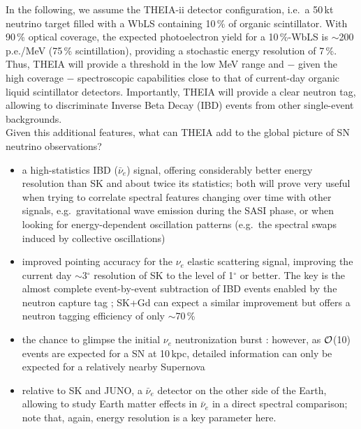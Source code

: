 In the following, we assume the THEIA-ii detector configuration, i.e.~a 50\,kt neutrino target filled with a WbLS containing 10\,\% of organic scintillator. With 90\,\% optical coverage, the expected photoelectron yield for a 10\,\%-WbLS is $\sim$200\,p.e./MeV (75\,\% scintillation), providing a stochastic energy resolution of 7\,\%. Thus, THEIA will provide a threshold in the low MeV range and $-$ given the high coverage $-$ spectroscopic capabilities close to that of current-day organic liquid scintillator detectors. Importantly, THEIA will provide a clear neutron tag, allowing to discriminate Inverse Beta Decay (IBD) events from other single-event backgrounds.
\medskip\\
Given this additional features, what can THEIA add to the global picture of SN neutrino observations? 
\begin{itemize}
\item a high-statistics IBD ($\bar\nu_e$) signal, offering considerably better energy resolution than SK and about twice its statistics; both will prove very useful when trying to correlate spectral features changing over time with other signals, e.g.~gravitational wave emission during the SASI phase, or when looking for energy-dependent oscillation patterns (e.g.~the spectral swaps induced by collective oscillations)
\item improved pointing accuracy for the $\nu_e$ elastic scattering signal, improving the current day $\sim$3$^\circ$ resolution of SK to the level of 1$^\circ$ or better. The key is the almost complete event-by-event subtraction of IBD events enabled by the neutron capture tag \cite{Tomas:2003xn}; SK+Gd can expect a similar improvement but offers a neutron tagging efficiency of only $\sim$70\,\%
\item the chance to glimpse the initial $\nu_e$ neutronization burst \cite{Kachelriess:2004ds}: however, as $\cal O$(10) events are expected for a SN at 10\,kpc, detailed information can only be expected for a relatively nearby Supernova
\item relative to SK and JUNO, a $\bar\nu_e$ detector on the other side of the Earth, allowing to study Earth matter effects in $\bar\nu_e$ in a direct spectral comparison; note that, again, energy resolution is a key parameter here.
\end{itemize}

